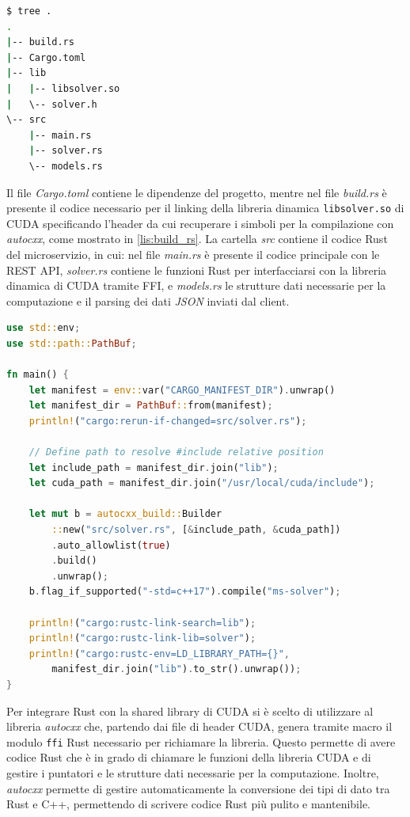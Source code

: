\vspace{5mm}
\begin{lstlisting}[language=bash, caption=Directory del progetto, label=lis:tree]
$ tree .
.
|-- build.rs
|-- Cargo.toml
|-- lib
|   |-- libsolver.so
|   \-- solver.h
\-- src
    |-- main.rs
    |-- solver.rs
    \-- models.rs
\end{lstlisting}
\vspace{5mm}

Il file \textit{Cargo.toml} contiene le dipendenze del progetto, mentre nel file \textit{build.rs} è presente il codice necessario per il linking della libreria dinamica \verb|libsolver.so| di CUDA specificando l'header da cui recuperare i simboli per la compilazione con \textit{autocxx}, come mostrato in \ref{lis:build_rs}. La cartella \textit{src} contiene il codice Rust del microservizio, in cui: nel file \textit{main.rs} è presente il codice principale con le REST API, \textit{solver.rs} contiene le funzioni Rust per interfacciarsi con la libreria dinamica di CUDA tramite FFI, e \textit{models.rs} le strutture dati necessarie per la computazione e il parsing dei dati \textit{JSON} inviati dal client.

\newpage
\vspace{5mm}
\begin{lstlisting}[language=Rust, caption=build.rs, label=lis:build_rs]
use std::env;
use std::path::PathBuf;

fn main() {
    let manifest = env::var("CARGO_MANIFEST_DIR").unwrap()
    let manifest_dir = PathBuf::from(manifest);
    println!("cargo:rerun-if-changed=src/solver.rs");

    // Define path to resolve #include relative position
    let include_path = manifest_dir.join("lib");
    let cuda_path = manifest_dir.join("/usr/local/cuda/include");
    
    let mut b = autocxx_build::Builder
        ::new("src/solver.rs", [&include_path, &cuda_path])
        .auto_allowlist(true)
        .build()
        .unwrap();
    b.flag_if_supported("-std=c++17").compile("ms-solver");

    println!("cargo:rustc-link-search=lib");
    println!("cargo:rustc-link-lib=solver");
    println!("cargo:rustc-env=LD_LIBRARY_PATH={}", 
        manifest_dir.join("lib").to_str().unwrap());
}
\end{lstlisting}
\vspace{5mm}


Per integrare Rust con la shared library di CUDA si è scelto di utilizzare al libreria \textit{autocxx} che, partendo dai file di header CUDA, genera tramite macro il modulo \verb|ffi| Rust necessario per richiamare la libreria. Questo permette di avere codice Rust che è in grado di chiamare le funzioni della libreria CUDA e di gestire i puntatori e le strutture dati necessarie per la computazione. Inoltre, \textit{autocxx} permette di gestire automaticamente la conversione dei tipi di dato tra Rust e C++, permettendo di scrivere codice Rust più pulito e mantenibile.

